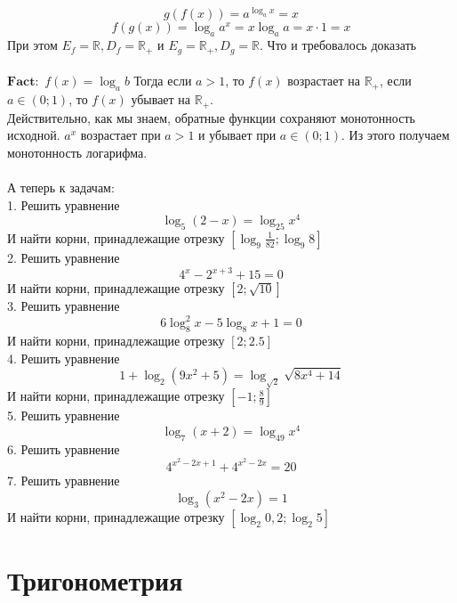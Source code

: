 \documentclass{article}
\begin{document}
\[ g(f(x)) = a^{\log_a x}  = x \]
\[ f(g(x)) = \log_a a^x = x \log_a a = x \cdot 1 = x \]
При этом \( E_f = \mathbb{R}, D_f = \mathbb{R}_+\) и 
\( E_g = \mathbb{R}_+, D_g = \mathbb{R}\). Что и требовалось доказать \\ \\
\(\mathbf{Fact:}\) \( f(x) = \log_a b \) Тогда если \( a > 1 \), то 
\( f(x) \) возрастает на $\mathbb{R}_+$, если \( a \in (0; 1) \), то
\( f(x) \) убывает на $\mathbb{R}_+$. \\
Действительно, как мы знаем, обратные функции сохраняют монотонность исходной.
\( a^x \) возрастает при $a > 1$ и убывает при \( a \in (0; 1) \). Из этого получаем
монотонность логарифма. \\ \\
А теперь к задачам: \\
1. Решить уравнение 
\[ \log_5 (2 - x) = \log_{25} x^4 \]
И найти корни, принадлежащие отрезку \( \left[ \log_9 \frac{1}{82}; \log_9 8 \right] \) \\

2. Решить уравнение 
\[ 4^x - 2^{x + 3} + 15 = 0 \]
И найти корни, принадлежащие отрезку \( \left[ 2; \sqrt{10} \right] \) \\
3. Решить уравнение 
\[ 6 \log^2_8 x - 5\log_8 x + 1 = 0 \]
И найти корни, принадлежащие отрезку \( \left[ 2; 2.5 \right] \) \\
4. Решить уравнение 
\[ 1 + \log_2 (9x^2 + 5) = \log_{\sqrt{2}}\sqrt{8x^4 + 14} \]
И найти корни, принадлежащие отрезку \( \left[ -1; \frac{8}{9} \right] \) \\
5. Решить уравнение 
\[ \log_7 (x + 2) = \log_{49} x^4 \]
6. Решить уравнение
\[ 4^{x^2 - 2x + 1} + 4^{x^2 - 2x} = 20 \]
7. Решить уравнение 
\[ \log_3 (x^2 - 2x) = 1 \]
И найти корни, принадлежащие отрезку \( \left[ \log_2 0,2; \log_2 5 \right] \)
\section{Тригонометрия}
\end{document}
